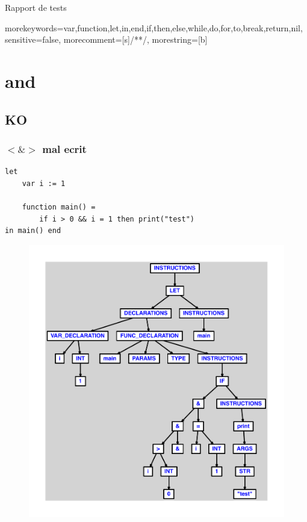\documentclass{article}
\begin{document}
{\thispagestyle{empty}}
\begin{center}
\vspace*{\fill}
{\Huge{Rapport de tests}}
\vspace*{\fill}
\end{center}
\newpage
{}
\tableofcontents
\newpage
{}
 {
morekeywords={var,function,let,in,end,if,then,else,while,do,for,to,break,return,nil},
sensitive=false,
morecomment=[s]{/*}{*/},
morestring=[b]
}

\section{and}
\subsection{KO}
\subsubsection{$ < $$ \& $$ > $ mal ecrit}
\begin{lstlisting}
let
	var i := 1

	function main() =
		if i > 0 && i = 1 then print("test")
in main() end
\end{lstlisting}
\newpage
\begin{figure}[H]
\centering
\includegraphics[max width=\textwidth]{ast/ast_0.pdf}
\end{figure}
\newpage
\end{document}
